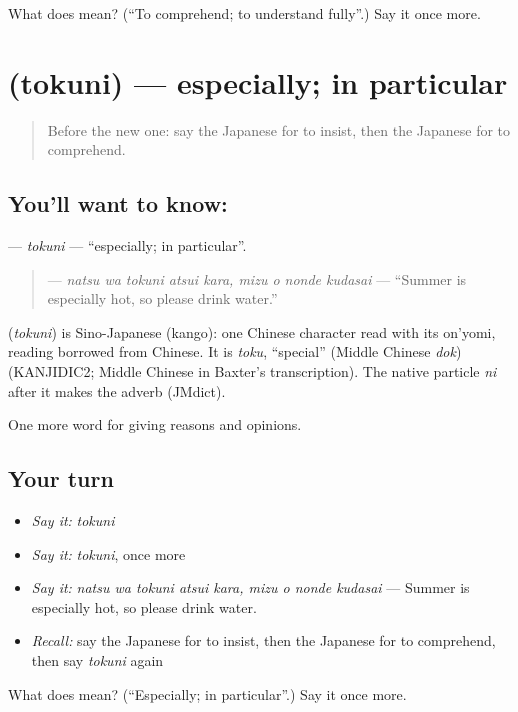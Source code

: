 \begin{tcolorbox}[breakable,colback=teal!4,colframe=teal!35!black,title={Before you move on}]
What does  mean? (\textquotedblleft{}To comprehend; to understand fully\textquotedblright{}.) Say it once more.
\end{tcolorbox}
\section[\texorpdfstring{\ja{とくに} (tokuni)}{とくに (tokuni)}]{ (tokuni) — especially; in particular}

\label{lesson:JA-C320-tokuni}



\begin{quote}
Before the new one: say the Japanese for to insist, then the Japanese for to comprehend.
\end{quote}

\subsection*{You'll want to know: }
\textbf{} — \emph{tokuni} — \textquotedblleft{}especially; in particular\textquotedblright{}.

\begin{quote}
\textbf{    } — \emph{natsu wa tokuni atsui kara, mizu o nonde kudasai} — \textquotedblleft{}Summer is especially hot, so please drink water.\textquotedblright{}
\end{quote}

\begin{cousinweb}
\textbf{} (\emph{tokuni}) is Sino-Japanese (kango): one Chinese character read with its on'yomi, reading borrowed from Chinese. It is \emph{toku}, \textquotedblleft{}special\textquotedblright{} (Middle Chinese \emph{dok}) (KANJIDIC2; Middle Chinese in Baxter's transcription). The native particle \emph{ni} after it makes the adverb (JMdict).
\end{cousinweb}

\begin{grammarlens}[title={What you've built}]
One more word for giving reasons and opinions.
\end{grammarlens}

\subsection*{Your turn}
\begin{itemize}
\raggedright
  \item \emph{Say it:} \emph{tokuni}
  \item \emph{Say it:} \emph{tokuni}, once more
  \item \emph{Say it:} \emph{natsu wa tokuni atsui kara, mizu o nonde kudasai} — Summer is especially hot, so please drink water.
  \item \emph{Recall:} say the Japanese for to insist, then the Japanese for to comprehend, then say \emph{tokuni} again
\end{itemize}

\begin{tcolorbox}[breakable,colback=teal!4,colframe=teal!35!black,title={Before you move on}]
What does  mean? (\textquotedblleft{}Especially; in particular\textquotedblright{}.) Say it once more.
\end{tcolorbox}
